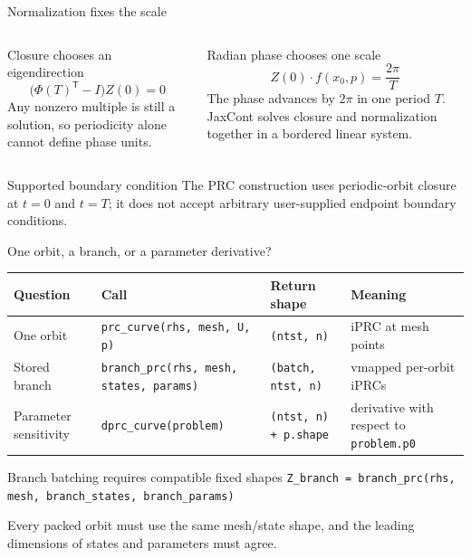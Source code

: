 \begin{frame}{Normalization fixes the scale}
\small
\begin{columns}[T,onlytextwidth]
\begin{block}{Closure chooses an eigendirection}
\[
  \bigl(\Phi(T)^{\mathsf T}-I\bigr)Z(0)=0
\]
Any nonzero multiple is still a solution, so periodicity alone cannot define phase units.
\end{block}
\begin{block}{Radian phase chooses one scale}
\[
  \boxed{Z(0)\cdot f(x_0,p)=\frac{2\pi}{T}}
\]
The phase advances by $2\pi$ in one period $T$. JaxCont solves closure and normalization together in a bordered linear system.
\end{block}
\end{columns}
\vspace{3mm}
\begin{alertblock}{Supported boundary condition}
The PRC construction uses periodic-orbit closure at $t=0$ and $t=T$; it does not accept arbitrary user-supplied endpoint boundary conditions.
\end{alertblock}
\end{frame}

\begin{frame}{One orbit, a branch, or a parameter derivative?}
\small
\mainbadge
\centering
\renewcommand{\arraystretch}{1.28}
\setlength{\tabcolsep}{3pt}
\begin{tabular}{@{}>{\raggedright\arraybackslash}p{}
                  >{\raggedright\arraybackslash}p{}
                  >{\raggedright\arraybackslash}p{}
                  >{\raggedright\arraybackslash}p{}@{}}
\toprule
Question & Call & Return shape & Meaning\\
\midrule
One orbit
  & \texttt{prc\_curve(rhs, mesh, U, p)}
  & \texttt{(ntst, n)}
  & iPRC at mesh points\\
Stored branch
  & \texttt{branch\_prc(rhs, mesh, states, params)}
  & \texttt{(batch, ntst, n)}
  & vmapped per-orbit iPRCs\\
Parameter sensitivity
  & \texttt{dprc\_curve(problem)}
  & \texttt{(ntst, n) + p.shape}
  & derivative with respect to \texttt{problem.p0}\\
\bottomrule
\end{tabular}
\vspace{3mm}
\begin{block}{Branch batching requires compatible fixed shapes}
\texttt{Z\_branch = branch\_prc(rhs, mesh, branch\_states, branch\_params)}

Every packed orbit must use the same mesh/state shape, and the leading dimensions of states and parameters must agree.
\end{block}
\end{frame}

